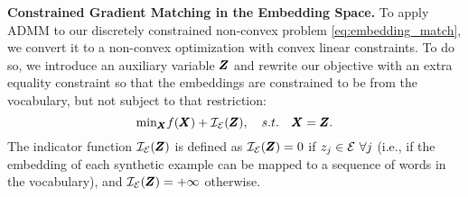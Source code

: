 %
\textbf{\!Constrained Gradient Matching in the Embedding Space.\!} 
%
%
%
%
%
To apply ADMM to our discretely constrained non-convex problem \ref{eq:embedding_match}, we convert it to a non-convex optimization with convex linear constraints.
To do so, we introduce an auxiliary variable $\pmb{Z}$ and rewrite our objective
with an extra equality constraint so that the embeddings are constrained to be from the vocabulary, but not subject to that restriction:
\begin{equation}\label{eq:admm_objective}
    {\min}_{\pmb{X}} f(\pmb{X}) + {\mathcal{I}}_{\mathcal{E}}(\pmb{Z}), \quad s.t. \quad \pmb{X} = \pmb{Z}.
\end{equation}
The indicator function ${\mathcal{I}}_{\mathcal{E}}(\pmb{Z})$ is defined as ${\mathcal{I}}_{\mathcal{E}}(\pmb{Z}) = 0$ if %
${z}_{j}\in {\mathcal{E}}~\forall j$ (i.e., if the embedding of each synthetic example can be mapped to a sequence of words in the vocabulary), and ${\mathcal{I}}_{\mathcal{E}}(\pmb{Z}) = +\infty$ otherwise.
%
%
%

